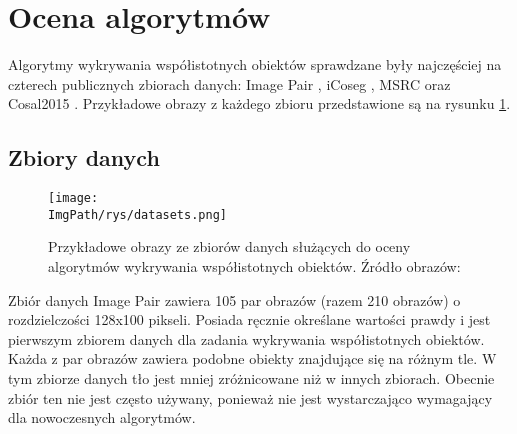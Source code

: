 \documentclass[a4paper,12pt,twoside,openany]{report}
\newcommand{\ImgPath}{.}
\begin{document}
	\section{Ocena algorytmów}
	Algorytmy wykrywania współistotnych obiektów sprawdzane były najczęściej na czterech publicznych zbiorach danych: Image Pair \cite{ImagePair}, iCoseg \cite{iCoseg}, MSRC \cite{MSRC} oraz Cosal2015 \cite{cosal2015}. Przykładowe obrazy z każdego zbioru przedstawione są na rysunku \ref{ds}. 

	\subsection{Zbiory danych}

	\begin{figure}[h]
		\centering
		\texttt{[image: \\ImgPath/rys/datasets.png]}
		\caption{Przykładowe obrazy ze zbiorów danych służących do oceny algorytmów wykrywania współistotnych obiektów. Źródło obrazów: \cite{10.1145/3158674}}
		\label{ds}
	\end{figure}

	Zbiór danych Image Pair \cite{ImagePair} zawiera 105 par obrazów (razem 210 obrazów) o rozdzielczości 128x100 pikseli. Posiada ręcznie określane wartości prawdy i jest pierwszym zbiorem danych dla zadania wykrywania współistotnych obiektów. Każda z par obrazów zawiera podobne obiekty znajdujące się na różnym tle. W tym zbiorze danych tło jest mniej zróżnicowane niż w innych zbiorach. Obecnie zbiór ten nie jest często używany, ponieważ nie jest wystarczająco wymagający dla nowoczesnych algorytmów.
	

\end{document}
